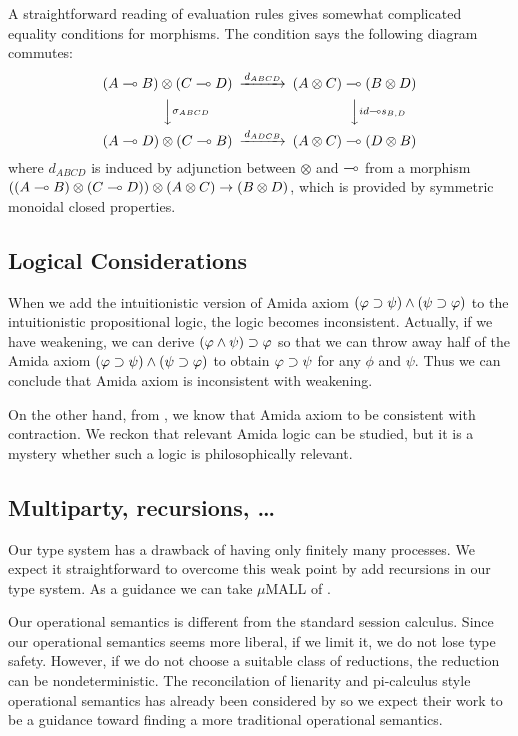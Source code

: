 A straightforward reading of evaluation rules gives somewhat complicated
equality conditions for morphisms.
The condition says the following diagram commutes:
\[
   \begin{CD}
    (A\limp B)\otimes (C\limp D) @>{d_{ABCD}}>> (A\otimes C)\limp(B\otimes D)\\
    @VV{\sigma_{ABCD}}V @VV{id\limp s_{B,D}}V\\
    (A\limp D)\otimes (C\limp B) @>{d_{ADCB}}>> (A\otimes C)\limp (D\otimes B)
   \end{CD}
\]
where $d_{ABCD}$ is induced by adjunction between $\otimes$ and $\multimap$
 from a morphism
 $((A\multimap B)\otimes (C\multimap D))\otimes (A\otimes C)\rightarrow
 (B\otimes D)$, which is provided by symmetric monoidal closed
 properties.

 \subsection{Logical Considerations}

 When we add
 the intuitionistic version of Amida axiom
 $(\varphi\supset\psi)\land(\psi\supset\varphi)$ to the intuitionistic propositional
 logic,
 the logic becomes inconsistent.
 Actually,
 if we have weakening, we can derive $(\varphi\land \psi)\supset \varphi$ so that
 we can throw away half of the Amida axiom
 $(\varphi\supset\psi)\land(\psi\supset\varphi)$ to obtain $\varphi\supset\psi$ for any
 $\phi$ and $\psi$.  Thus we can conclude that Amida axiom is
 inconsistent with weakening.

 On the other hand, from , we know that Amida
 axiom to be consistent with contraction.
 We reckon that relevant Amida logic can be studied, but
 it is a mystery whether such a logic is philosophically relevant.

\subsection{Multiparty, recursions, \ldots}
Our type system has a drawback of having only finitely many processes.
We expect it straightforward to overcome this weak point by
add recursions in our type system.
As a guidance we can take $\mu$MALL of \citet{mumall}.

Our operational semantics is different from the standard session
calculus.  Since our operational semantics seems more liberal,
if we limit it, we do not lose type safety.  However, if we do not
choose a suitable class of reductions, the reduction can be
nondeterministic.
The reconcilation of lienarity and pi-calculus style operational
semantics has already been considered by
\citet{kobayashi-pierce-turner} so we expect their work to be a
guidance toward finding a more traditional operational semantics.

